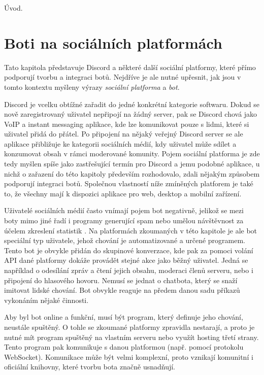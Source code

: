 \documentclass[FM]{tulthesis}
\begin{document}
	Úvod.
	
	\chapter{Boti na sociálních platformách}
	
	Tato kapitola představuje Discord a některé další sociální platformy, které přímo podporují tvorbu a integraci botů. Nejdříve je ale nutné upřesnit, jak jsou v tomto kontextu myšleny výrazy \textit{sociální platforma} a \textit{bot}.
	
	Discord je vcelku obtížné zařadit do jedné konkrétní kategorie softwaru. Dokud se nově zaregistrovaný uživatel nepřipojí na žádný server, pak se Discord chová jako VoIP a instant messaging aplikace, kde lze komunikovat pouze s lidmi, které si uživatel přidá do přátel. Po připojení na nějaký veřejný Discord server se ale aplikace přibližuje ke kategorii sociálních médií, kdy uživatel může sdílet a konzumovat obsah v rámci moderované komunity. Pojem sociální platforma je zde tedy myšlen spíše jako zastřešující termín pro Discord a jemu podobné aplikace, u nichž o zařazení do této kapitoly především rozhodovalo, zdali nějakým způsobem podporují integraci botů. Společnou vlastností níže zmíněných platforem je také to, že všechny mají k dispozici aplikace pro web, desktop a mobilní zařízení.
	
	Uživatelé sociálních médií často vnímají pojem bot negativně, jelikož se mezi boty mimo jiné řadí i programy generující spam nebo umělou návštěvnost za účelem zkreslení statistik \cite{lit_Discord}. Na platformách zkoumaných v této kapitole je ale bot speciální typ uživatele, jehož chování je automatizované a určené programem. Tento bot je obvykle přidán do skupinové konverzace, kde pak za pomoci volání API dané platformy dokáže provádět stejné akce jako běžný uživatel. Jedná se například o odesílání zpráv a čtení jejich obsahu, moderaci členů serveru, nebo i připojení do hlasového hovoru. Nemusí se jednat o chatbota, který se snaží imitovat lidské chování. Bot obvykle reaguje na předem danou sadu příkazů vykonáním nějaké činnosti.
		
	Aby byl bot online a funkční, musí být program, který definuje jeho chování, neustále spuštěný. O tohle se zkoumané platformy zpravidla nestarají, a proto je nutné mít program spuštěný na vlastním serveru nebo využít hosting třetí strany. Tento program pak komunikuje s danou platformou (např. pomocí protokolu \mbox{WebSocket}). Komunikace může být velmi komplexní, proto vznikají komunitní i oficiální knihovny, které tvorbu bota značně usnadňují.
	
\end{document}
